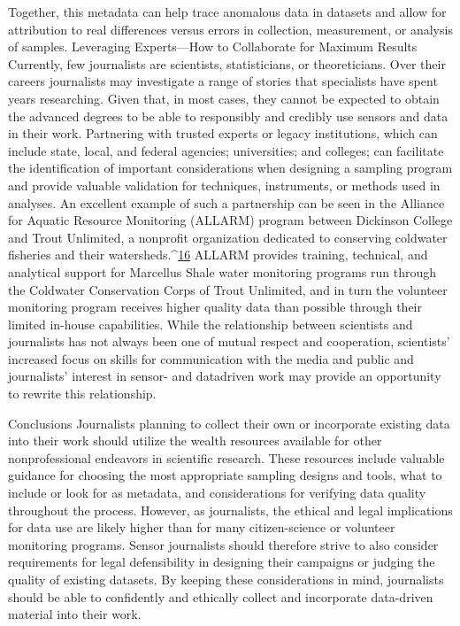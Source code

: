 \begin{itemize}
Together, this metadata can help trace anomalous data in datasets and allow
for attribution to real differences versus errors in collection, measurement,
or analysis of samples.
Leveraging Experts—How to Collaborate for
Maximum Results
Currently, few journalists are scientists, statisticians, or theoreticians. Over
their careers journalists may investigate a range of stories that specialists
have spent years researching. Given that, in most cases, they cannot
be expected to obtain the advanced degrees to be able to responsibly and
credibly use sensors and data in their work. Partnering with trusted experts
or legacy institutions, which can include state, local, and federal agencies;
universities; and colleges; can facilitate the identification of important considerations
when designing a sampling program and provide valuable validation
for techniques, instruments, or methods used in analyses.
An excellent example of such a partnership can be seen in the Alliance for
Aquatic Resource Monitoring (ALLARM) program between Dickinson College
and Trout Unlimited, a nonprofit organization dedicated to conserving
coldwater fisheries and their watersheds.^{\href{#endnotes-stauffer}{16}} ALLARM provides training,
technical, and analytical support for Marcellus Shale water monitoring programs
run through the Coldwater Conservation Corps of Trout Unlimited,
and in turn the volunteer monitoring program receives higher quality data
than possible through their limited in-house capabilities. While the relationship
between scientists and journalists has not always been one of mutual
respect and cooperation, scientists' increased focus on skills for communication
with the media and public and journalists' interest in sensor- and datadriven
work may provide an opportunity to rewrite this relationship.

Conclusions
Journalists planning to collect their own or incorporate existing data into
their work should utilize the wealth resources available for other nonprofessional
endeavors in scientific research. These resources include valuable
guidance for choosing the most appropriate sampling designs and tools,
what to include or look for as metadata, and considerations for verifying
data quality throughout the process.
However, as journalists, the ethical and legal implications for data use are
likely higher than for many citizen-science or volunteer monitoring programs.
Sensor journalists should therefore strive to also consider requirements
for legal defensibility in designing their campaigns or judging the
quality of existing datasets. By keeping these considerations in mind, journalists
should be able to confidently and ethically collect and incorporate
data-driven material into their work.


\end{itemize}
